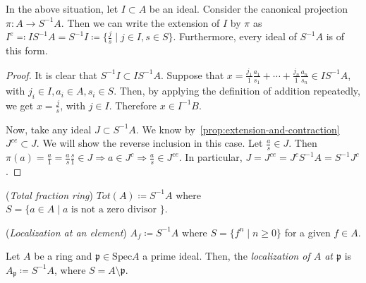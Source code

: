         \begin{prop} \label{prop:extension-in-fractions}
            In the above situation, let $I \subset A$ be an ideal.
            Consider the canonical projection $\pi: A \rightarrow S^{-1}A$.
            Then we can write the extension of $I$ by $\pi$ as
            $I^{e} \eqqcolon IS^{-1}A = S^{-1}I \coloneqq \{\frac{j}{s} \mid j \in I, s \in S \}$.
            Furthermore, every ideal of $S^{-1}A$ is of this form.
        \end{prop}
            \begin{proof}
                    It is clear that $S^{-1}I \subset IS^{-1}A$.
                    Suppose that $x = \frac{j_1}{1} \frac{a_1}{s_1} + \cdots + \frac{j_n}{1} \frac{a_n}{s_n} \in IS^{-1}A$,
                    with $j_i \in I, a_i \in A, s_i \in S$.
                    Then, by applying the definition of addition repeatedly, we get
                    $x = \frac{j}{s}$, with $j \in I$.
                    Therefore $x \in I^{-1}B$.

                    \noindent Now, take any ideal $J \subset S^{-1}A$.
                    We know by~\ref{prop:extension-and-contraction} $J^{ce} \subset J$.
                    We will show the reverse inclusion in this case.
                    Let $\frac{a}{s} \in J.$ Then $\pi(a) = \frac{a}{1} = \frac{a}{s} \frac{s}{1} \in J \Rightarrow a \in J^c \Rightarrow \frac{a}{s} \in J^{ce} $.
                    In particular, $J = J^{ce} = J^{c}S^{-1}A = S^{-1}J^{c}$.
                    \end{proof}

        \begin{defn}
            (\emph{Total fraction ring}) $Tot(A) \coloneqq S^{-1}A$ where $S = \{a \in A \mid a \text{ is not a zero divisor }\}$.
        \end{defn}

        \begin{defn}
            (\emph{Localization at an element}) $A_f \coloneqq S^{-1}A$ where $S = \{f^n \mid n \geq 0\}$ for a given $f \in A$.
        \end{defn}

        \begin{defn}
            Let $A$ be a ring and $\mathfrak{p} \in \text{Spec}A$ a prime ideal.
            Then, the \emph{localization of $A$ at $\mathfrak{p}$} is $A_{\mathfrak{p}} \coloneqq S^{-1}A$, where $S = A \setminus \mathfrak{p}$.
        \end{defn}

